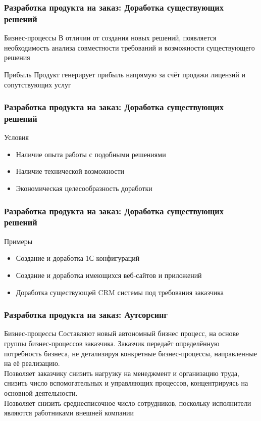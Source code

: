 \documentclass{../industrial-development}
\begin{document}
\begin{frame} \frametitle{Разработка продукта на заказ: Доработка существующих решений}
	\begin{block}{Бизнес-процессы}
		В отличии от создания новых решений, появляется необходимость анализа совместности требований и возможности существующего решения
	\end{block}
	\begin{block}{Прибыль}
		Продукт генерирует прибыль напрямую за счёт продажи лицензий и сопутствующих услуг
	\end{block}
\end{frame}
\lecturenotes


\begin{frame} \frametitle{Разработка продукта на заказ: Доработка существующих решений}
	\begin{block}{Условия}
		\begin{itemize}
			\item Наличие опыта работы с подобными решениями
			\item Наличие технической возможности
			\item Экономическая целесообразность доработки
		\end{itemize}
	\end{block}
\end{frame}
\lecturenotes


\begin{frame} \frametitle{Разработка продукта на заказ: Доработка существующих решений}
	\begin{block}{Примеры}
		\begin{itemize}
			\item Создание и доработка 1С конфигураций
			\item Создание и доработка имеющихся веб-сайтов и приложений
			\item Доработка существующей CRM системы под требования заказчика
		\end{itemize}
	\end{block}
\end{frame}
\lecturenotes


\begin{frame} \frametitle{Разработка продукта на заказ: Аутсорсинг}
	\begin{block}{Бизнес-процессы}
		Составляют новый автономный бизнес процесс, на основе группы бизнес-процессов заказчика. Заказчик передаёт определённую потребность бизнеса, не детализируя конкретные бизнес-процессы, направленные на её реализацию.\\
		Позволяет заказчику снизить нагрузку на менеджмент и организацию труда, снизить число вспомогательных и управляющих процессов, концентрируясь на основной деятельности.\\
		Позволяет снизить среднесписочное число сотрудников, поскольку исполнители являются работниками внешней компании
	\end{block}
\end{frame}
\lecturenotes
\end{document}
